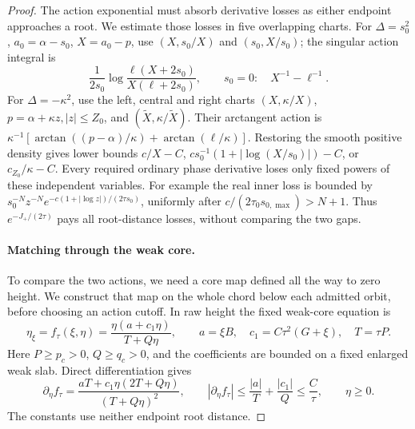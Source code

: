\begin{proof}
The action exponential must absorb derivative losses as either endpoint
approaches a root. We estimate those losses in five overlapping charts.
For \(\Delta=s_0^2\), \(a_0=\alpha-s_0\), \(X=a_0-p\), use
\((X,s_0/X)\) and \((s_0,X/s_0)\); the singular action integral is
\[
 \frac1{2s_0}\log\frac{\ell(X+2s_0)}{X(\ell+2s_0)},
                    \qquad s_0=0:\quad X^{-1}-\ell^{-1}.
\]
For \(\Delta=-\kappa^2\), use the left, central and right charts
\((X,\kappa/X)\), \(p=\alpha+\kappa z,|z|\le Z_0\), and
\((\widetilde X,\kappa/\widetilde X)\). Their arctangent action is
\(\kappa^{-1}[\arctan((p-\alpha)/\kappa)+\arctan(\ell/\kappa)]\).
Restoring the smooth positive density gives lower bounds
\(c/X-C\), \(cs_0^{-1}(1+|\log(X/s_0)|)-C\), or
\(c_{Z_0}/\kappa-C\). Every required ordinary phase derivative loses
only fixed powers of these independent variables. For example the real
inner loss is bounded by
\(s_0^{-N}z^{-N}e^{-c(1+|\log z|)/(2\tau s_0)}\), uniformly after
\(c/(2\tau_0s_{0,\max})>N+1\). Thus \(e^{-J_+/(2\tau)}\) pays
all root-distance losses, without comparing the two gaps.

\paragraph{Matching through the weak core.}
To compare the two actions, we need a core map defined all the way to
zero height. We construct that map on the whole chord below each
admitted orbit, before choosing an action cutoff. In raw height the
fixed weak-core equation is
\[
 \eta_\xi=f_\tau(\xi,\eta)
 =\frac{\eta(a+c_1\eta)}{T+Q\eta},\qquad
 a=\xi B,\quad c_1=C\tau^2(G+\xi),\quad T=\tau P.
\]
Here \(P\ge p_c>0\), \(Q\ge q_c>0\), and the coefficients are
bounded on a fixed enlarged weak slab. Direct differentiation gives
\[
 \partial_\eta f_\tau
 =\frac{aT+c_1\eta(2T+Q\eta)}{(T+Q\eta)^2},\qquad
 |\partial_\eta f_\tau|
 \le\frac{|a|}{T}+\frac{|c_1|}{Q}\le\frac C\tau,
 \qquad \eta\ge0.
\]
The constants use neither endpoint root distance.


\end{proof}
